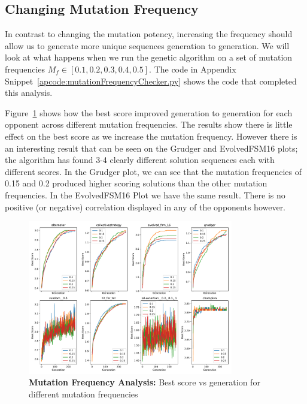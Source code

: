 \subsection{Changing Mutation Frequency}\label{subsec:changingMutationFrequency}
In contrast to changing the mutation potency, increasing the frequency should allow us to generate more unique sequences generation to generation.
We will look at what happens when we run the genetic algorithm on a set of mutation frequencies \(M_f \in [0.1,0.2,0.3,0.4,0.5]\).
The code in Appendix Snippet~\ref{apcode:mutationFrequencyChecker.py} shows the code that completed this analysis.

Figure~\ref{fig:MUT-FREQ-bs-v-gen-all} shows how the best score improved generation to generation for each opponent across different mutation frequencies.
The results show there is little effect on the best score as we increase the mutation frequency.
However there is an interesting result that can be seen on the Grudger and EvolvedFSM16 plots; the algorithm has found 3-4 clearly different solution sequences each with different scores.
In the Grudger plot, we can see that the mutation frequencies of 0.15 and 0.2 produced higher scoring solutions than the other mutation frequencies.
In the EvolvedFSM16 Plot we have the same result.
There is no positive (or negative) correlation displayed in any of the opponents however.

\begin{figure}[h]
    \includegraphics[width=0.8\textwidth, keepaspectratio, center]{./img/plots/MUT_FREQ_bs_v_gen_all.pdf}
    \caption{\textbf{Mutation Frequency Analysis:} Best score vs generation for different mutation frequencies}\label{fig:MUT-FREQ-bs-v-gen-all}
\end{figure}


